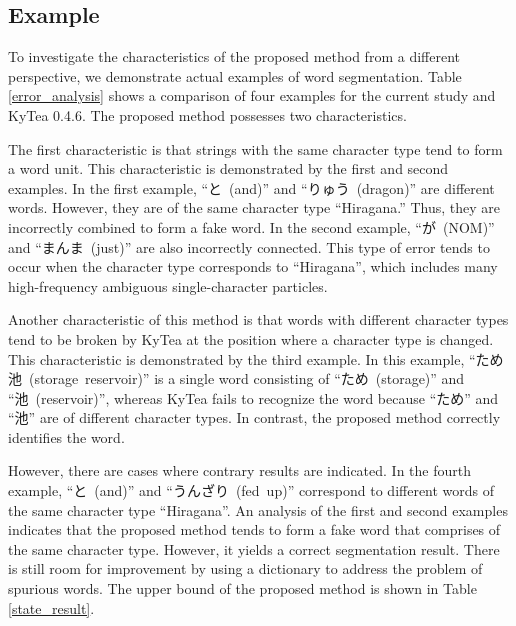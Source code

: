 \documentclass[11pt]{article}
\begin{document}
\subsection{Example}
To investigate the characteristics of the proposed method from a
different perspective, we demonstrate actual examples of word segmentation.
Table \ref{error_analysis} shows a comparison of four examples for the current
study and KyTea 0.4.6.
The proposed method possesses two characteristics.

The first characteristic is that strings with the same character type tend to
form a word unit. This characteristic is demonstrated by the first and second
examples.
In the first example, \mbox{``と (and)''} and
\mbox{``りゅう (dragon)''} are different words.
However, they are of the same character type ``Hiragana.'' Thus, they are
incorrectly combined to form a fake word. In the second example,
\mbox{``が (NOM)'' } and \mbox{``まんま (just)''} are also incorrectly
connected. This type of error tends to occur when the character type
corresponds to \mbox{``Hiragana''}, which includes many high-frequency
ambiguous single-character particles.
 
Another characteristic of this method is that words with different
character types tend to be broken by KyTea at the position where a character
type is changed. This characteristic is demonstrated by the third example. In
this example, \mbox{``ため池 (storage reservoir)''} is a single word
consisting of \mbox{``ため (storage)''} and \mbox{``池 (reservoir)''},
whereas KyTea fails to recognize the word because \mbox{``ため''} and
\mbox{``池''} are of different character types. In contrast, the proposed
method correctly identifies the word.

However, there are cases where contrary results are indicated. In the fourth
example, \mbox{``と (and)''} and \mbox{``うんざり (fed up)''} correspond to
different words of the same character type \mbox{``Hiragana''}. An analysis of
the first and second examples indicates that the proposed method tends to form
a fake word that comprises of the same character type. However, it yields a
correct segmentation result. There is still room for improvement by using a
dictionary to address the problem of spurious words. The upper bound of
the proposed method is shown in Table \ref{state_result}.
\end{document}
